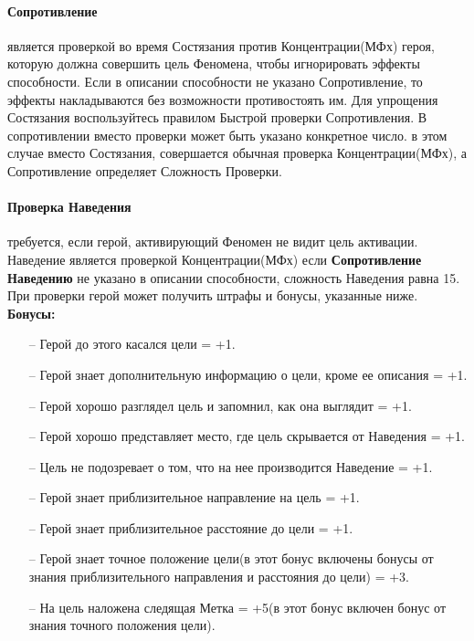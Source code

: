 \paragraph{Сопротивление} является проверкой во время Состязания против Концентрации(МФх) героя, которую должна совершить цель Феномена, чтобы игнорировать эффекты способности. Если в описании способности не указано Сопротивление, то эффекты накладываются без возможности противостоять им. Для упрощения Состязания воспользуйтесь правилом Быстрой проверки Сопротивления. В сопротивлении вместо проверки может быть указано конкретное число. в этом случае вместо Состязания, совершается обычная проверка Концентрации(МФх), а Сопротивление определяет Сложность Проверки.


\paragraph{Проверка Наведения} требуется, если герой, активирующий Феномен не видит цель активации. Наведение является проверкой Концентрации(МФх) если \textbf{Сопротивление Наведению} не указано в описании способности, сложность Наведения равна 15. При проверки герой может получить штрафы и бонусы, указанные ниже.
\newline
\textbf{Бонусы:}
\begin{itemize}
\item[--]Герой до этого касался цели = +1.
\item[--]Герой знает дополнительную информацию о цели, кроме ее описания = +1.
\item[--]Герой хорошо разглядел цель и запомнил, как она выглядит = +1.
\item[--]Герой хорошо представляет место, где цель скрывается от Наведения = +1.
\item[--]Цель не подозревает о том, что на нее производится Наведение = +1.
\item[--]Герой знает приблизительное направление на цель = +1.
\item[--]Герой знает приблизительное расстояние до цели = +1.
\item[--]Герой знает точное положение цели(в этот бонус включены бонусы от знания приблизительного направления и расстояния до цели) = +3.
\item[--]На цель наложена следящая Метка = +5(в этот бонус включен бонус от знания точного положения цели).

\end{itemize}
